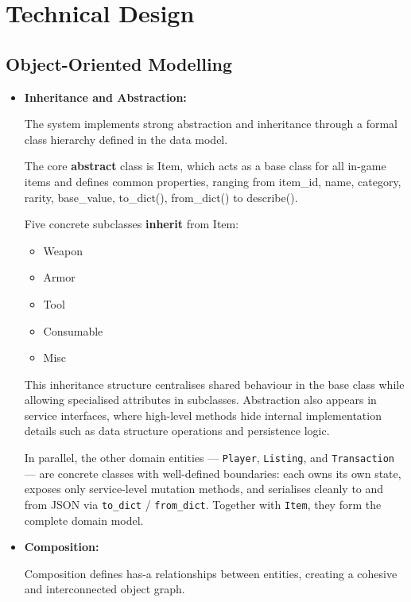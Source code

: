 \documentclass[11pt,a4paper]{article}
\begin{document}
\section{Technical Design}
\label{sec:technical_design}

\subsection{Object-Oriented Modelling}
\begin{itemize}
    \item \textbf{Inheritance and Abstraction:}

    The system implements strong abstraction and inheritance through a formal class hierarchy defined in the data model.

    The core \textbf{abstract} class is Item, which acts as a base class for all in-game items and defines common properties, ranging from item\_id, name, category, rarity, base\_value, to\_dict(), from\_dict() to describe().

    Five concrete subclasses \textbf{inherit} from Item:
    \begin{itemize}
        \item Weapon
        \item Armor
        \item Tool
        \item Consumable
        \item Misc
    \end{itemize}

    This inheritance structure centralises shared behaviour in the base class while allowing specialised attributes in subclasses. Abstraction also appears in service interfaces, where high-level methods hide internal implementation details such as data structure operations and persistence logic.

    In parallel, the other domain entities — \texttt{Player}, \texttt{Listing}, and \texttt{Transaction} — are concrete classes with well-defined boundaries: each owns its own state, exposes only service-level mutation methods, and serialises cleanly to and from JSON via \texttt{to\_dict} / \texttt{from\_dict}. Together with \texttt{Item}, they form the complete domain model.


    \item \textbf{Composition:}

    Composition defines has-a relationships between entities, creating a cohesive and interconnected object graph.


\end{itemize}
\end{document}

